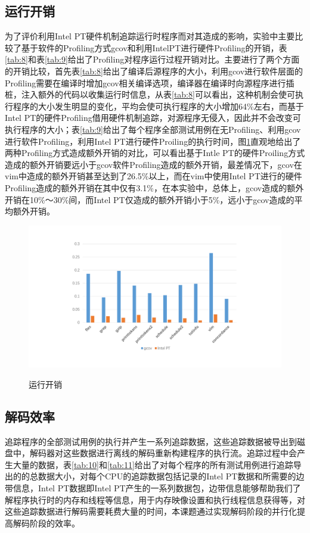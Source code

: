 \subsection{运行开销}
为了评价利用Intel PT硬件机制追踪运行时程序而对其造成的影响，实验中主要比较了基于软件的Profiling方式gcov和利用IntelPT进行硬件Profiling的开销，表\ref{tab:8}和表\ref{tab:9}给出了Profiling对程序运行过程开销对比。主要进行了两个方面的开销比较，首先表\ref{tab:8}给出了编译后源程序的大小，利用gcov进行软件层面的Profiling需要在编译时增加gcov相关编译选项，编译器在编译时向源程序进行插桩，注入额外的代码以收集运行时信息，从表\ref{tab:8}可以看出，这种机制会使可执行程序的大小发生明显的变化，平均会使可执行程序的大小增加64\%左右，而基于Intel PT的硬件Profiling借用硬件机制追踪，对源程序无侵入，因此并不会改变可执行程序的大小；表\ref{tab:9}给出了每个程序全部测试用例在无Profiling、利用gcov进行软件Profiling，利用Intel PT进行硬件Proiling的执行时间，图\ref{fig:cost}直观地给出了两种Profiling方式造成额外开销的对比，可以看出基于Intle PT的硬件Proiling方式造成的额外开销要远小于gcov软件Profiling造成的额外开销，最差情况下，gcov在vim中造成的额外开销甚至达到了26.5\%以上，而在vim中使用Intel PT进行的硬件Profiling造成的额外开销在其中仅有3.1\%，在本实验中，总体上，gcov造成的额外开销在10\%～30\%间，而Intel PT仅造成的额外开销小于5\%，远小于gcov造成的平均额外开销。
\begin{figure}[!htb]
  \centering
  \includegraphics[width=1.0\textwidth]
  {figures/cost.pdf}\\
  \caption{运行开销}
  \label{fig:cost}
\end{figure}

\subsection{解码效率}
追踪程序的全部测试用例的执行并产生一系列追踪数据，这些追踪数据被导出到磁盘中，解码器对这些数据进行离线的解码重新构建程序的执行流。追踪过程中会产生大量的数据，表\ref{tab:10}和\ref{tab:11}给出了对每个程序的所有测试用例进行追踪导出的的总数据大小，对每个CPU的追踪数据包括记录的Intel PT数据和所需要的边带信息，Intel PT数据即Intel PT产生的一系列数据包，边带信息能够帮助我们了解程序执行时的内存和线程等信息，用于内存映像设置和执行线程信息获得等，对这些追踪数据进行解码需要耗费大量的时间，本课题通过实现解码阶段的并行化提高解码阶段的效率。

